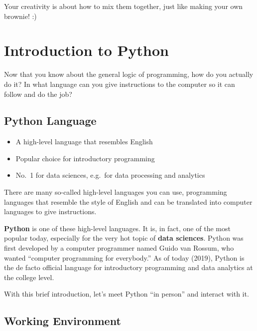 \documentclass[
  letterpaper,
]{scrbook}
\providecommand{\tightlist}{%
  \setlength{\itemsep}{0pt}\setlength{\parskip}{0pt}}
\begin{document}
Your creativity is about how to mix them together, just like making your
own brownie! :)

\chapter*{Introduction to Python}\label{introduction-to-python}


Now that you know about the general logic of programming, how do you
actually do it? In what language can you give instructions to the
computer so it can follow and do the job?

\section*{Python Language}\label{python-language}


\begin{itemize}
\tightlist
\item
  A high-level language that resembles English
\item
  Popular choice for introductory programming
\item
  No.~1 for data sciences, e.g.~for data processing and analytics
\end{itemize}

There are many so-called high-level languages you can use, programming
languages that resemble the style of English and can be translated into
computer languages to give instructions.

\textbf{Python} is one of these high-level languages. It is, in fact,
one of the most popular today, especially for the very hot topic of
\textbf{data sciences}. Python was first developed by a computer
programmer named Guido van Rossum, who wanted ``computer programming for
everybody.'' As of today (2019), Python is the de facto official
language for introductory programming and data analytics at the college
level.

With this brief introduction, let's meet Python ``in person'' and
interact with it.

\section*{Working Environment}\label{working-environment}
\end{document}
